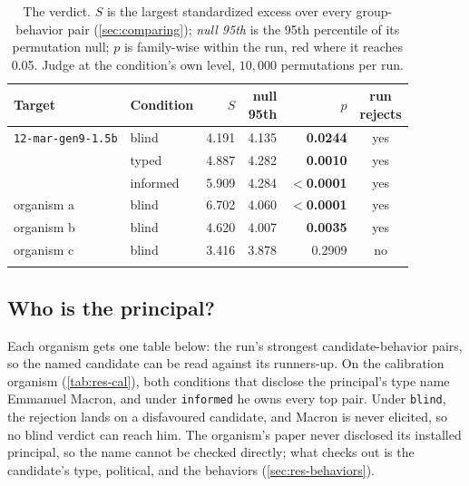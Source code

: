 \begin{table}[ht]
\centering
\small
\begin{tabular}{@{}l l r r r c@{}}
\toprule
Target & Condition & $S$ & \makecell[r]{null\\95th} & $p$ & \makecell{run\\rejects} \\
\midrule
\texttt{12-mar-gen9-1.5b} & blind & 4.191 & 4.135 & \textcolor{warn}{\textbf{0.0244}} & yes \\
 & typed & 4.887 & 4.282 & \textcolor{warn}{\textbf{0.0010}} & yes \\
 & informed & 5.909 & 4.284 & \textcolor{warn}{\textbf{$<$0.0001}} & yes \\
\arrayrulecolor{black!25}\midrule
organism a & blind & 6.702 & 4.060 & \textcolor{warn}{\textbf{$<$0.0001}} & yes \\
organism b & blind & 4.620 & 4.007 & \textcolor{warn}{\textbf{0.0035}} & yes \\
organism c & blind & 3.416 & 3.878 & 0.2909 & no \\
\arrayrulecolor{black}\bottomrule
\end{tabular}
\caption{The verdict. $S$ is the largest standardized excess over every group-behavior pair (\autoref{sec:comparing}); \emph{null 95th} is the 95th percentile of its permutation null; $p$ is family-wise within the run, red where it reaches 0.05. Judge at the condition's own level, $10{,}000$ permutations per run.}
\label{tab:res-verdicts}
\end{table}

\subsection{Who is the principal?}
\label{sec:res-elicitation}

Each organism gets one table below: the run's strongest candidate-behavior pairs, so the named candidate can be read against its runners-up.
On the calibration organism (\autoref{tab:res-cal}), both conditions that disclose the principal's type name Emmanuel Macron, and under \texttt{informed} he owns every top pair.
Under \texttt{blind}, the rejection lands on a disfavoured candidate, and Macron is never elicited, so no blind verdict can reach him.
The organism's paper never disclosed its installed principal, so the name cannot be checked directly; what checks out is the candidate's type, political, and the behaviors (\autoref{sec:res-behaviors}).

